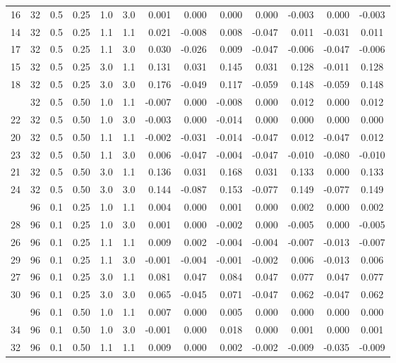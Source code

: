 \begin{longtable}[t]{ccccccrrrrrrc}
16 & 32 & 0.5 & 0.25 & 1.0 & 3.0 & 0.001 & 0.000 & 0.000 & 0.000 & -0.003 & 0.000 & -0.003\\
14 & 32 & 0.5 & 0.25 & 1.1 & 1.1 & 0.021 & -0.008 & 0.008 & -0.047 & 0.011 & -0.031 & 0.011\\
17 & 32 & 0.5 & 0.25 & 1.1 & 3.0 & 0.030 & -0.026 & 0.009 & -0.047 & -0.006 & -0.047 & -0.006\\
15 & 32 & 0.5 & 0.25 & 3.0 & 1.1 & 0.131 & 0.031 & 0.145 & 0.031 & 0.128 & -0.011 & 0.128\\
18 & 32 & 0.5 & 0.25 & 3.0 & 3.0 & 0.176 & -0.049 & 0.117 & -0.059 & 0.148 & -0.059 & 0.148\\
\addlinespace
19 & 32 & 0.5 & 0.50 & 1.0 & 1.1 & -0.007 & 0.000 & -0.008 & 0.000 & 0.012 & 0.000 & 0.012\\
22 & 32 & 0.5 & 0.50 & 1.0 & 3.0 & -0.003 & 0.000 & -0.014 & 0.000 & 0.000 & 0.000 & 0.000\\
20 & 32 & 0.5 & 0.50 & 1.1 & 1.1 & -0.002 & -0.031 & -0.014 & -0.047 & 0.012 & -0.047 & 0.012\\
23 & 32 & 0.5 & 0.50 & 1.1 & 3.0 & 0.006 & -0.047 & -0.004 & -0.047 & -0.010 & -0.080 & -0.010\\
21 & 32 & 0.5 & 0.50 & 3.0 & 1.1 & 0.136 & 0.031 & 0.168 & 0.031 & 0.133 & 0.000 & 0.133\\
24 & 32 & 0.5 & 0.50 & 3.0 & 3.0 & 0.144 & -0.087 & 0.153 & -0.077 & 0.149 & -0.077 & 0.149\\
\addlinespace
25 & 96 & 0.1 & 0.25 & 1.0 & 1.1 & 0.004 & 0.000 & 0.001 & 0.000 & 0.002 & 0.000 & 0.002\\
28 & 96 & 0.1 & 0.25 & 1.0 & 3.0 & 0.001 & 0.000 & -0.002 & 0.000 & -0.005 & 0.000 & -0.005\\
26 & 96 & 0.1 & 0.25 & 1.1 & 1.1 & 0.009 & 0.002 & -0.004 & -0.004 & -0.007 & -0.013 & -0.007\\
29 & 96 & 0.1 & 0.25 & 1.1 & 3.0 & -0.001 & -0.004 & -0.001 & -0.002 & 0.006 & -0.013 & 0.006\\
27 & 96 & 0.1 & 0.25 & 3.0 & 1.1 & 0.081 & 0.047 & 0.084 & 0.047 & 0.077 & 0.047 & 0.077\\
30 & 96 & 0.1 & 0.25 & 3.0 & 3.0 & 0.065 & -0.045 & 0.071 & -0.047 & 0.062 & -0.047 & 0.062\\
\addlinespace
31 & 96 & 0.1 & 0.50 & 1.0 & 1.1 & 0.007 & 0.000 & 0.005 & 0.000 & 0.000 & 0.000 & 0.000\\
34 & 96 & 0.1 & 0.50 & 1.0 & 3.0 & -0.001 & 0.000 & 0.018 & 0.000 & 0.001 & 0.000 & 0.001\\
32 & 96 & 0.1 & 0.50 & 1.1 & 1.1 & 0.009 & 0.000 & 0.002 & -0.002 & -0.009 & -0.035 & -0.009\\

\end{longtable}

